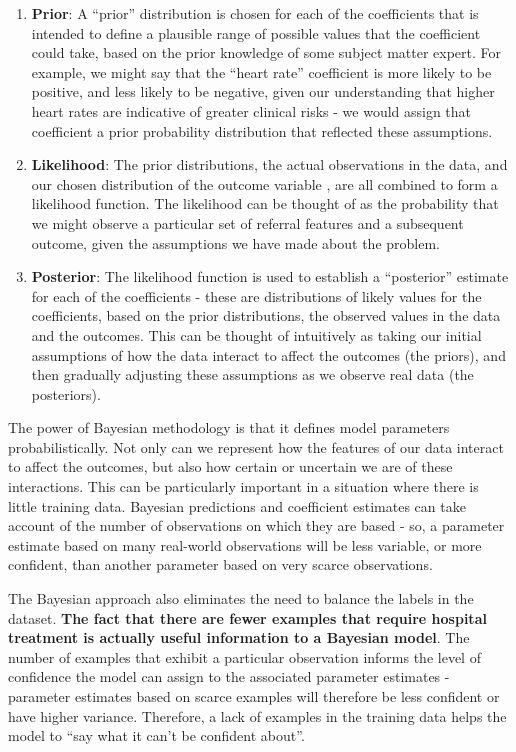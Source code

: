 \begin{enumerate}
    \item \textbf{Prior}: A ``prior'' distribution is chosen for each of the coefficients that is intended to define a plausible range of possible values that the coefficient could take, based on the prior knowledge of some subject matter expert. For example, we might say that the ``heart rate'' coefficient is more likely to be positive, and less likely to be negative, given our understanding that higher heart rates are indicative of greater clinical risks - we would assign that coefficient  a prior probability distribution that reflected these assumptions.
    \item \textbf{Likelihood}: The prior distributions, the actual observations in the data, and our chosen distribution of the outcome variable , are all combined to form a likelihood function. The likelihood can be thought of as the probability that we might observe a particular set of referral features and a subsequent outcome, given the assumptions we have made about the problem.
    \item \textbf{Posterior}: The likelihood function is used to establish a ``posterior'' estimate for each of the coefficients - these are distributions of likely values for the coefficients, based on the prior distributions, the observed values in the data and the outcomes. This can be thought of intuitively as taking our initial assumptions of how the data interact to affect the outcomes (the priors), and then gradually adjusting these assumptions as we observe real data (the posteriors).
\end{enumerate}

The power of Bayesian methodology is that it defines model parameters probabilistically. Not only can we represent how the features of our data interact to affect the outcomes, but also how certain or uncertain we are of these interactions. This can be particularly important in a situation where there is little training data. Bayesian predictions and coefficient estimates can take account of the number of observations on which they are based - so, a parameter estimate based on many real-world observations will be less variable, or more confident, than another parameter based on very scarce observations.

The Bayesian approach also eliminates the need to balance the labels in the dataset. \textbf{The fact that there are fewer examples that require hospital treatment is actually useful information to a Bayesian model}. The number of examples that exhibit a particular observation informs the level of confidence the model can assign to the associated parameter estimates - parameter estimates based on scarce examples will therefore be less confident or have higher variance. Therefore, a lack of examples in the training data helps the model to ``say what it can't be confident about''.

